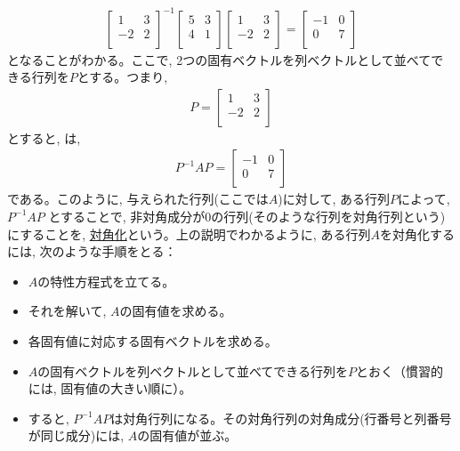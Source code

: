 \begin{eqnarray}
\begin{bmatrix}
1 & 3\\
-2 & 2\\
\end{bmatrix}^{-1}
\begin{bmatrix}
5 & 3 \\
4 & 1 \\
\end{bmatrix}
\begin{bmatrix}
1 & 3\\
-2 & 2\\
\end{bmatrix}
=\begin{bmatrix}
-1 & 0 \\
0 & 7 \\
\end{bmatrix}\label{eq:matrix_orthogonalize_6}
\end{eqnarray}
となることがわかる。ここで, 2つの固有ベクトルを列ベクトルとして並べてできる行列を$P$とする。つまり, 
\begin{eqnarray}
P=\begin{bmatrix}
1 & 3\\
-2 & 2\\
\end{bmatrix}
\end{eqnarray}
とすると, は, 
\begin{eqnarray}
P^{-1}AP
=\begin{bmatrix}
-1 & 0 \\
0 & 7 \\
\end{bmatrix}\label{eq:matrix_orthogonalize_9}
\end{eqnarray}
である。このように, 与えられた行列(ここでは$A$)に対して, ある行列$P$によって, $P^{-1}AP$
とすることで, 非対角成分が0の行列(そのような行列を対角行列という)
にすることを, \underline{対角化}という。上の説明でわかるように, 
ある行列$A$を対角化するには, 次のような手順をとる：
\begin{itemize}
\item $A$の特性方程式を立てる。
\item それを解いて, $A$の固有値を求める。
\item 各固有値に対応する固有ベクトルを求める。
\item $A$の固有ベクトルを列ベクトルとして並べてできる行列を$P$とおく（慣習的には, 固有値の大きい順に）。
\item すると, $P^{-1}AP$は対角行列になる。その対角行列の対角成分(行番号と列番号が同じ成分)には, $A$の固有値が並ぶ。
\end{itemize}
\mv

